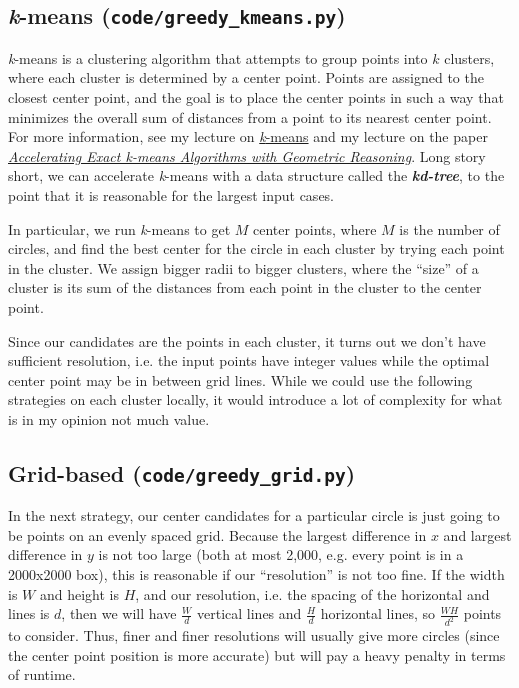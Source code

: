 \documentclass[11pt, oneside]{article}
\newcommand{\emphasis}[1]{\textbf{\textit{#1}}}
\begin{document}
\subsection{\textit{k}-means (\texttt{code/greedy\_kmeans.py})}
\textit{k}-means is a clustering algorithm that attempts to group points into
\( k \) clusters, where each cluster is determined by a center point. Points
are assigned to the closest center point, and the goal is to place the center
points in such a way that minimizes the overall sum of distances from a point
to its nearest center point. For more information, see my lecture on
\href{https://activities.tjhsst.edu/computervision/lectures/kmeans_Handout.pdf}{\textit{k}-means}
and my lecture on the paper
\href{https://docs.google.com/presentation/d/1U8PiAoVIe2rvfzQ_q9tECdlYfy-mHq6HnJUC45Wy9Y4/edit?usp=sharing}
{\textit{Accelerating Exact k-means Algorithms with Geometric Reasoning}}.
Long story short, we can accelerate \textit{k}-means with a data structure
called the \emphasis{kd-tree}, to the point that it is reasonable for the
largest input cases.

In particular, we run \textit{k}-means to get \( M \) center points, where
\( M \) is the number of circles, and find the best center for the circle
in each cluster by trying each point in the cluster. We assign bigger radii
to bigger clusters, where the \enquote{size} of a cluster is its sum of the
distances from each point in the cluster to the center point.

Since our candidates are the points in each cluster, it turns out we don't
have sufficient resolution, i.e. the input points have integer values while
the optimal center point may be in between grid lines. While we could use
the following strategies on each cluster locally, it would introduce a lot
of complexity for what is in my opinion not much value.

\subsection{Grid-based (\texttt{code/greedy\_grid.py})}
In the next strategy, our center candidates for a particular circle is just
going to be points on an evenly spaced grid. Because the largest difference
in \( x \) and largest difference in \( y \) is not too large (both at most
2,000, e.g. every point is in a 2000x2000 box), this is reasonable if our
\enquote{resolution} is not too fine. If the width is \( W \) and height is \(
H \), and our resolution, i.e. the spacing of the horizontal and lines is \(
d \), then we will have \( \frac{W}{d} \) vertical lines and \( \frac{H}{d}
\) horizontal lines, so \( \frac{WH}{d^2} \) points to consider. Thus, finer
and finer resolutions will usually give more circles (since the center point
position is more accurate) but will pay a heavy penalty in terms of runtime.
\end{document}
